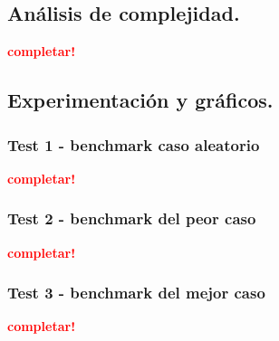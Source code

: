 \newpage
\subsection{Análisis de complejidad.}

\vspace*{0.3cm}

\textcolor{red}{\textbf{completar!}}



\newpage
\subsection{Experimentación y gráficos.}

\vspace*{0.3cm}

\subsubsection{Test 1 - benchmark caso aleatorio}

\textcolor{red}{\textbf{completar!}}


\newpage
\subsubsection{Test 2 - benchmark del peor caso}

\textcolor{red}{\textbf{completar!}}


\newpage
\subsubsection{Test 3 - benchmark del mejor caso}

\textcolor{red}{\textbf{completar!}}
